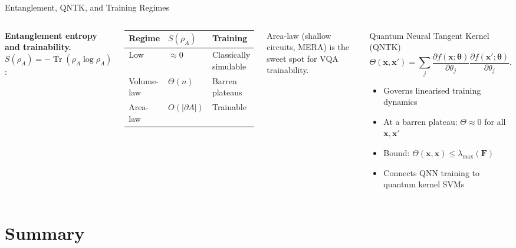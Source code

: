 \documentclass[aspectratio=169,10pt]{beamer}
\newcommand{\btheta}{\boldsymbol{\theta}}
\newcommand{\QFI}{\mathbf{F}}
\newcommand{\Tr}{\operatorname{Tr}}
\begin{document}
\begin{frame}{Entanglement, QNTK, and Training Regimes}
  \begin{columns}[T]
    \textbf{Entanglement entropy and trainability.}
    $S(\rho_A)=-\Tr(\rho_A\log\rho_A)$:

    \medskip
    \begin{center}
    \begin{tabular}{lll}
      \toprule
      Regime & $S(\rho_A)$ & Training \\
      \midrule
      Low & $\approx 0$ & Classically simulable \\
      Volume-law & $\Theta(n)$ & Barren plateaus \\
      Area-law & $O(|\partial A|)$ & Trainable \\
      \bottomrule
    \end{tabular}
    \end{center}
    Area-law (shallow circuits, MERA) is the sweet spot
    for VQA trainability.
    \begin{block}{Quantum Neural Tangent Kernel (QNTK)}
      \[
        \Theta(\mathbf{x},\mathbf{x}')
        = \sum_j
          \frac{\partial f(\mathbf{x};\btheta)}{\partial\theta_j}
          \frac{\partial f(\mathbf{x}';\btheta)}{\partial\theta_j}.
      \]
      \begin{itemize}\itemsep2pt
        \item Governs linearised training dynamics
        \item At a barren plateau:
              $\Theta\approx 0$ for all $\mathbf{x},\mathbf{x}'$
        \item Bound: $\Theta(\mathbf{x},\mathbf{x})
              \leq\lambda_{\max}(\QFI)$
        \item Connects QNN training to quantum kernel SVMs
      \end{itemize}
    \end{block}
  \end{columns}
\end{frame}

\section{Summary}
\end{document}
